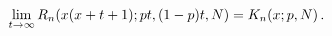 \[\lim_{t\to\infty}\mathop{R_{n}\/}\nolimits\!\left(x(x+t+1);pt,(1-p)t,N\right)=%
\mathop{K_{n}\/}\nolimits\!\left(x;p,N\right).\]